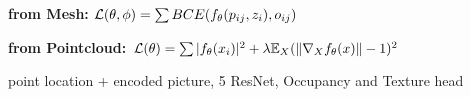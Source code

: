 \textbf{from Mesh:} $\mathcal{L}(\theta, \phi) = \sum BCE(f_\theta(p_{ij}, z_i), o_{ij})$\\

\textbf{from Pointcloud:} $\mathcal{L}(\theta) = \sum |f_\theta(x_i)|^2 + \lambda \mathbb{E}_X(\left\lVert \nabla_X f_\theta(x) \right\rVert - 1)^2$\\

 point location + encoded picture, 5 ResNet, Occupancy and Texture head\\


